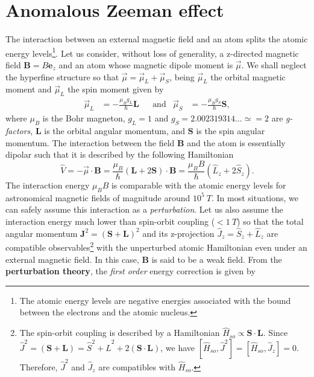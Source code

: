 %
\chapter{Anomalous Zeeman effect}
\label{ap:anomalous-Zeeman-effect}
%

The interaction between an external magnetic field and an atom splits the atomic energy levels\footnote{The atomic energy levels are negative energies associated with the bound between the electrons and the atomic nucleus.}. Let us consider, without loss of generality, a z-directed magnetic field $ \mathbf{B} = B \mathbf{e}_z $ and an atom whose magnetic dipole moment is $ \vec{\mu} $. We shall neglect the hyperfine structure so that $ \vec{\mu} = \vec{\mu}_{L} + \vec{\mu}_{S} $, being $ \vec{\mu}_{L} $ the orbital magnetic moment and $ \vec{\mu}_{L} $ the spin moment given by
\begin{align}
	\vec{\mu}_{L} &= -\frac{\mu_B g_L}{\hbar} \mathbf{L} & &\textrm{and} & \vec{\mu}_{S} &= -\frac{\mu_B g_S}{\hbar} \mathbf{S},
\end{align}
where $ \mu_B $ is the Bohr magneton, $ g_L = 1 $ and $ g_S = 2.002319314... \simeq = 2 $ are \textit{g-factors}, $ \mathbf{L} $ is the orbital angular momentum, and $ \mathbf{S} $ is the spin angular momentum. The interaction between the field $ \mathbf{B} $ and the atom is essentially dipolar such that it is described by the following Hamiltonian 
\begin{equation}
	\hat{V} = - \vec{\mu} \cdot \mathbf{B} = \frac{\mu_B}{\hbar}(\mathbf{L} + 2\mathbf{S}) \cdot \mathbf{B} = \frac{\mu_B B}{\hbar}(\hat{L}_z + 2 \hat{S}_z).
	\label{eq:dipolar-magnetic-interaction}
\end{equation}
The interaction energy $ \mu_B B $ is comparable with the atomic energy levels for astronomical magnetic fields of magnitude around $ 10^{5}\ T $. In most situations, we can safely assume this interaction as a \textit{perturbation}. Let us also assume the interaction energy much lower than spin-orbit coupling ($ < 1\ T $) so that the total angular momentum $ \mathbf{J}^2 = (\mathbf{S} + \mathbf{L})^2 $ and its z-projection $ \hat{J}_z = \hat{S}_z + \hat{L}_z $ are compatible observables\footnote{The spin-orbit coupling is described by a Hamiltonian $ \hat{H}_{so} \propto \mathbf{S} \cdot \mathbf{L} $. Since $ \hat{J}^2 = (\mathbf{S} + \mathbf{L}) = \hat{S}^2 + \hat{L}^2 + 2(\mathbf{S} \cdot \mathbf{L}) $, we have $ [\hat{H}_{so}, \hat{J}^2] = [\hat{H}_{so}, \hat{J}_z] = 0 $. Therefore, $ \hat{J}^2 $ and $ \hat{J}_z $ are compatibles with $ \hat{H}_{so} $.} with the unperturbed atomic Hamiltonian even under an external magnetic field. In this case, $ \mathbf{B} $ is said to be a weak field. From the \textbf{perturbation theory}, the \textit{first order} energy correction is given by
